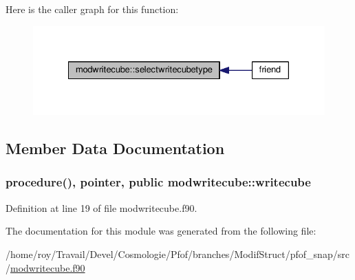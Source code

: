 Here is the caller graph for this function\-:\nopagebreak
\begin{figure}[H]
\begin{center}
\leavevmode
\includegraphics[width=328pt]{classmodwritecube_a9a2b869100e0425d256a5dda14a55d49_icgraph}
\end{center}
\end{figure}




\subsection{Member Data Documentation}
\hypertarget{classmodwritecube_a72634b2d307b36dad9644259f46f9cce}{
\subsubsection[{writecube}]{\setlength{\rightskip}{0pt plus 5cm}procedure(), pointer, public modwritecube\-::writecube}}\label{classmodwritecube_a72634b2d307b36dad9644259f46f9cce}


Definition at line 19 of file modwritecube.\-f90.



The documentation for this module was generated from the following file\-:\begin{DoxyCompactItemize}
\item 
/home/roy/\-Travail/\-Devel/\-Cosmologie/\-Pfof/branches/\-Modif\-Struct/pfof\-\_\-snap/src/\hyperlink{modwritecube_8f90}{modwritecube.\-f90}\end{DoxyCompactItemize}
